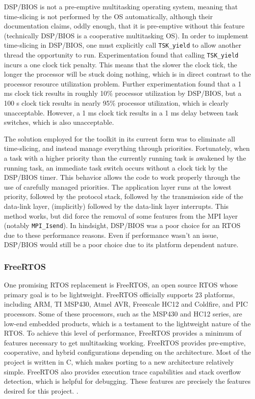 DSP/BIOS is not a pre-emptive multitasking operating system, meaning that time-slicing is not performed by the OS automatically, although their documentation claims, oddly enough, that it is pre-emptive without this feature (technically DSP/BIOS is a cooperative multitasking OS). In order to implement time-slicing in DSP/BIOS, one must explicitly call \lstinline$TSK_yield$ to allow another thread the opportunity to run. Experimentation found that calling \lstinline$TSK_yield$ incurs a one clock tick penalty. This means that the slower the clock tick, the longer the processor will be stuck doing nothing, which is in direct contrast to the processor resource utilization problem. Further experimentation found that a 1 ms clock tick results in roughly 10\% processor utilization by DSP/BIOS, but a 100 \textmu s clock tick results in nearly 95\% processor utilization, which is clearly unacceptable. However, a 1 ms clock tick results in a 1 ms delay between task switches, which is also unacceptable. 

The solution employed for the toolkit in its current form was to eliminate all time-slicing, and instead manage everything through priorities. Fortunately, when a task with a higher priority than the currently running task is awakened by the running task, an immediate task switch occurs without a clock tick by the DSP/BIOS timer. This behavior allows the code to work properly through the use of carefully managed priorities. The application layer runs at the lowest priority, followed by the protocol stack, followed by the transmission side of the data-link layer, (implicitly) followed by the data-link layer interrupts. This method works, but did force the removal of some features from the MPI layer (notably \lstinline$MPI_Isend$). In hindsight, DSP/BIOS was a poor choice for an RTOS due to these performance reasons. Even if performance wasn't an issue, DSP/BIOS would still be a poor choice due to its platform dependent nature.

\subsubsection{FreeRTOS} \label{sec:conclusions:future_work:platform_independence:freertos}

One promising RTOS replacement is FreeRTOS, an open source RTOS whose primary goal is to be lightweight. FreeRTOS officially supports 23 platforms, including ARM, TI MSP430, Atmel AVR, Freescale HC12 and Coldfire, and PIC processors. Some of these processors, such as the MSP430 and HC12 series, are low-end embedded products, which is a testament to the lightweight nature of the RTOS. To achieve this level of performance, FreeRTOS provides a minimum of features necessary to get multitasking working. FreeRTOS provides pre-emptive, cooperative, and hybrid configurations depending on the architecture. Most of the project is written in C, which makes porting to a new architecture relatively simple. FreeRTOS also provides execution trace capabilities and stack overflow detection, which is helpful for debugging. These features are precisely the features desired for this project. \cite{ref:2010-freertos-freertos}.

